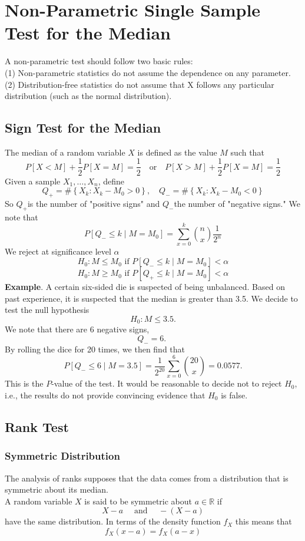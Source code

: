 \documentclass[a4paper,12pt]{article}
\begin{document}
\section{Non-Parametric Single Sample Test for the Median}
A non-parametric test should follow two basic rules:\\
(1) Non-parametric statistics do not assume the dependence on any parameter.\\
(2) Distribution-free statistics do not assume that X follows any particular distribution (such as the normal distribution).
\subsection{Sign Test for the Median}
The median of a random variable $X$ is defined as the value $M$ such that
\begin{equation}
P[X<M]+\frac{1}{2} P[X=M]=\frac{1}{2} \quad \text{or} \quad P[X>M]+\frac{1}{2} P[X=M]=\frac{1}{2}
\end{equation}
Given a sample $X_1, \ldots, X_n$, define
$$
Q_{+}=\#\left\{X_k: X_k-M_0>0\right\}, \quad Q_{-}=\#\left\{X_k: X_k-M_0<0\right\}
$$
So $Q_{+}$is the number of "positive signs" and $Q_{-}$the number of "negative signs." We note that
$$
P\left[Q_{-} \leq k \mid M=M_0\right]=\sum_{x=0}^k \binom{n}{x} \frac{1}{2^n}
$$
We reject at significance level $\alpha$
$$H_0: M \leq M_0\text{ if }P\left[Q_{-} \leq k \mid M=M_0\right]<\alpha$$
$$H_0: M \geq M_0\text{ if }P\left[Q_{+} \leq k \mid M=M_0\right]<\alpha$$
\textbf{Example}. A certain six-sided die is suspected of being unbalanced. Based on past experience, it is suspected that the median is greater than 3.5. We decide to test the null hypothesis
$$
H_0: M \leq 3.5 .
$$
We note that there are 6 negative signs,
$$
Q_{-}=6 \text {. }
$$
By rolling the dice for 20 times, we then find that
$$
P\left[Q_{-} \leq 6 \mid M=3.5\right]=\frac{1}{2^{20}} \sum_{x=0}^6\binom{20}{x}=0.0577 .
$$
This is the $P$-value of the test. It would be reasonable to decide not to reject $H_0$, i.e., the results do not provide convincing evidence that $H_0$ is false.

\subsection{Rank Test}
\subsubsection{Symmetric Distribution}
The analysis of ranks supposes that the data comes from a distribution that is symmetric about its median.\\
A random variable $X$ is said to be symmetric about $a \in \mathbb{R}$ if
$$
X-a \quad \text { and } \quad-(X-a)
$$
have the same distribution.
In terms of the density function $f_X$ this means that
\begin{equation}
f_X(x-a)=f_X(a-x)
\end{equation}
\end{document}

